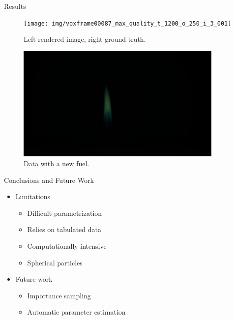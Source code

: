 \documentclass{beamer}
\begin{document}
\begin{frame}[allowframebreaks]{Results}
\begin{figure}[p]
\begin{center}
\texttt{[image: img/voxframe00087\_max\_quality\_t\_1200\_o\_250\_i\_3\_001]} 
\caption*{\tiny{Left rendered image, right ground truth.}}
\end{center}
\end{figure}

\begin{figure}[p]
\begin{center}
\includegraphics[width=0.9\textwidth]{img/copper_flame} 
\caption*{\tiny{Data with a new fuel.}}
\end{center}
\end{figure}


\end{frame}

\begin{frame}{Conclusions and Future Work}

\begin{itemize}
\setlength\itemsep{0.5em}
\item Limitations
	\begin{itemize}
	\setlength\itemsep{0.5em}
	\item Difficult parametrization
	\item Relies on tabulated data
	\item Computationally intensive
	\item Spherical particles
	\end{itemize}
\item Future work
	\begin{itemize}
	\setlength\itemsep{0.5em}
	\item Importance sampling
	\item Automatic parameter estimation
	\end{itemize}
\end{itemize}

\end{frame}
\end{document}
